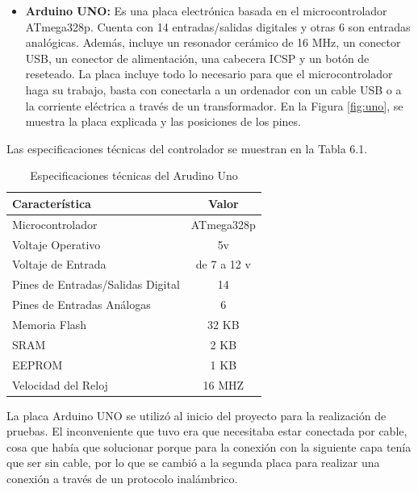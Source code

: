 \begin{itemize}
    \item \textbf{Arduino UNO:} Es una placa electrónica basada en el microcontrolador ATmega328p. Cuenta con 14 entradas/salidas digitales y otras 6 son entradas analógicas. Además, incluye un resonador cerámico de 16 MHz, un conector USB, un conector de alimentación, una cabecera ICSP y un botón de reseteado. La placa incluye todo lo necesario para que el microcontrolador haga su trabajo, basta con conectarla a un ordenador con un cable USB o a la corriente eléctrica a través de un transformador. En la Figura \ref{fig:uno}, se muestra la placa explicada y las posiciones de los pines.
\end{itemize}

\newpage
\fancyhead{}
\fancyfoot{}
\renewcommand{\headrulewidth}{0.5pt}
\fancyhead[LE,RO]{\textsl{\thepage}}
\fancyhead[RE]{\textsl{\nouppercase{\leftmark}}}
\fancyhead[LO]{\textsl{\nombreTFG}}
Las especificaciones técnicas del controlador se muestran en la Tabla 6.1.

\begin{table}[h]
    \centering
    \begin{tabular}{|l|c|}
        \rowcolor[gray]{.5}
        \hline
        \color{white}Característica & \color{white}Valor \\
        \hline
        Microcontrolador & ATmega328p \\
        \hline
        Voltaje Operativo & 5v \\
        \hline
        Voltaje de Entrada  & de 7 a 12 v \\
        \hline
        Pines de Entradas/Salidas Digital & 14 \\
        \hline
        Pines de Entradas Análogas & 6 \\
        \hline
        Memoria Flash & 32 KB \\
        \hline
        SRAM & 2 KB \\
        \hline
        EEPROM & 1 KB \\
        \hline
        Velocidad del Reloj & 16 MHZ \\
        \hline
    \end{tabular}
    \caption{Especificaciones técnicas del Arudino Uno}
    \label{tab:arduinouno}
\end{table}

La placa Arduino UNO se utilizó al inicio del proyecto para la realización de pruebas. El inconveniente que tuvo era que necesitaba estar conectada por cable, cosa que había que solucionar porque  para la conexión con la siguiente capa tenía que ser sin cable, por lo que se cambió a la segunda placa para realizar una conexión a través de un protocolo inalámbrico.

